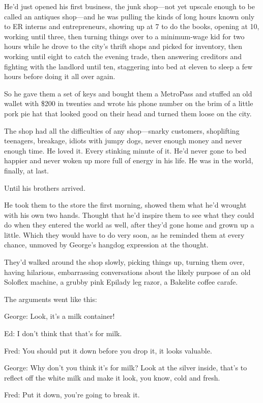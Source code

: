 He'd just opened his first business, the junk shop---not yet upscale
enough to be called an antiques shop---and he was pulling the kinds of
long hours known only to ER interns and entrepreneurs, showing up at 7
to do the books, opening at 10, working until three, then turning
things over to a minimum-wage kid for two hours while he drove to the
city's thrift shops and picked for inventory, then working until eight
to catch the evening trade, then answering creditors and fighting with
the landlord until ten, staggering into bed at eleven to sleep a few
hours before doing it all over again.

So he gave them a set of keys and bought them a MetroPass and stuffed
an old wallet with \$200 in twenties and wrote his phone number on the
brim of a little pork pie hat that looked good on their head and
turned them loose on the city.

The shop had all the difficulties of any shop---snarky customers,
shoplifting teenagers, breakage, idiots with jumpy dogs, never enough
money and never enough time.  He loved it.  Every stinking minute of
it.  He'd never gone to bed happier and never woken up more full of
energy in his life.  He was in the world, finally, at last.

Until his brothers arrived.

He took them to the store the first morning, showed them what he'd
wrought with his own two hands.  Thought that he'd inspire them to see
what they could do when they entered the world as well, after they'd
gone home and grown up a little.  Which they would have to do very
soon, as he reminded them at every chance, unmoved by George's hangdog
expression at the thought.

They'd walked around the shop slowly, picking things up, turning them
over, having hilarious, embarrassing conversations about the likely
purpose of an old Soloflex machine, a grubby pink Epilady leg razor, a
Bakelite coffee carafe.

The arguments went like this:

George:  Look, it's a milk container!

Ed:  I don't think that that's for milk.

Fred:  You should put it down before you drop it, it looks valuable.

George:  Why don't you think it's for milk?  Look at the silver
inside, that's to reflect off the white milk and make it look, you
know, cold and fresh.

Fred:  Put it down, you're going to break it.

